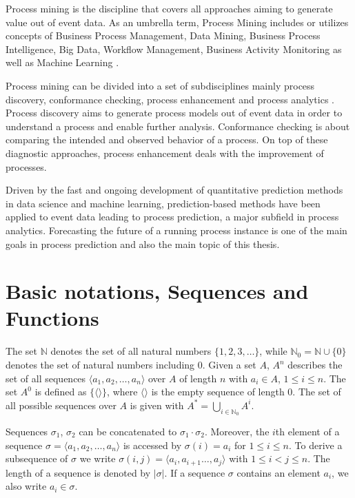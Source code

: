Process mining is the discipline that covers all approaches aiming to generate value out of event data.
As an umbrella term, Process Mining includes or utilizes concepts of Business Process Management, Data Mining, Business Process Intelligence, Big Data, Workflow Management, Business Activity Monitoring \cite{DBLP:books/sp/Aalst16} as well as Machine Learning \cite{DBLP:conf/bpm/VeitGMHT17}.

Process mining can be divided into a set of subdisciplines mainly process discovery, conformance checking, process enhancement and process analytics \cite{DBLP:conf/caise/EckLLA15}.
Process discovery aims to generate process models out of event data in order to understand a process and enable further analysis.
Conformance checking is about comparing the intended and observed behavior of a process. 
On top of these diagnostic approaches, process enhancement deals with the improvement of processes.

Driven by the fast and ongoing development of quantitative prediction methods in data science and machine learning, prediction-based methods have been applied to event data leading to process prediction, a major subfield in process analytics.
Forecasting the future of a running process instance is one of the main goals in process prediction and also the main topic of this thesis.


\section{Basic notations, Sequences and Functions}

The set $\mathbb{N}$ denotes the set of all natural numbers $\{1, 2, 3, \dots\}$, while $\mathbb{N}_0 = \mathbb{N} \cup \{0\}$ denotes the set of natural numbers including 0.
Given a set $A$, $A^n$ describes the set of all sequences $\langle a_1, a_2, \dots, a_n\rangle$ over $A$ of length $n$ with $a_i \in A$, $1 \leq i \leq n$.
The set $A^0$ is defined as $\{\langle \rangle\}$, where $\langle \rangle$ is the empty sequence of length $0$.
The set of all possible sequences over $A$ is given with $A^* = \bigcup\limits_{i\in \mathbb{N}_0} A^i$.

Sequences $\sigma_1$, $\sigma_2$ can be concatenated to $\sigma_1 \cdot \sigma_2$.
Moreover, the $i$th element of a sequence $\sigma = \langle a_1, a_2, \dots, a_n\rangle$ is accessed by $\sigma(i)= a_i$ for $1 \leq i \leq n$.
To derive a subsequence of $\sigma$ we write $\sigma(i,j)=\langle a_i, a_{i+1} \dots, a_j\rangle$ with $1 \leq i < j \leq n$.
The length of a sequence is denoted by $|\sigma|$. If a sequence $\sigma$ contains an element $a_i$, we also write $a_i \in \sigma$.

